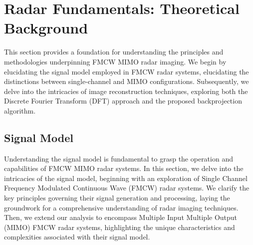 \chapter{Radar Fundamentals: Theoretical Background}
This section provides a foundation for understanding the principles and methodologies underpinning FMCW MIMO radar imaging.
We begin by elucidating the signal model employed in FMCW radar systems, elucidating the distinctions between single-channel and MIMO configurations.
Subsequently, we delve into the intricacies of image reconstruction techniques,
exploring both the Discrete Fourier Transform (DFT) approach and the proposed backprojection algorithm.

\section{Signal Model}
Understanding the signal model is fundamental to grasp the operation and capabilities of FMCW MIMO radar systems.
In this section, we delve into the intricacies of the signal model,
beginning with an exploration of Single Channel Frequency Modulated Continuous Wave (FMCW) radar systems.
We clarify the key principles governing their signal generation and processing,
laying the groundwork for a comprehensive understanding of radar imaging techniques.
Then, we extend our analysis to encompass Multiple Input Multiple Output (MIMO) FMCW radar systems,
highlighting the unique characteristics and complexities associated with their signal model.


